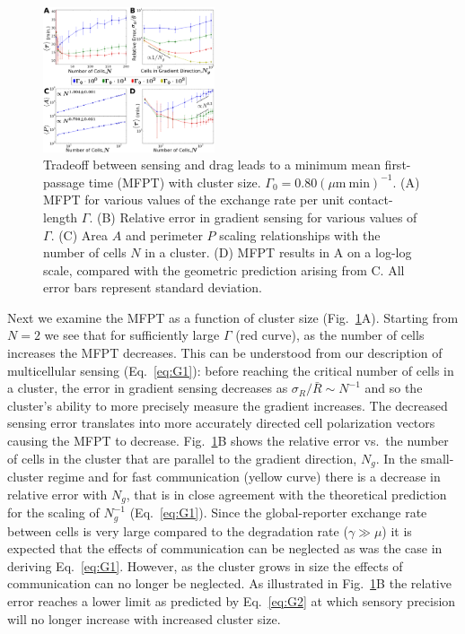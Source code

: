 \begin{figure}[t]
    \centering
        \includegraphics[width=0.45\textwidth]{../fig/ch2_fig3.png}
    \caption{Tradeoff between sensing and drag leads to a minimum mean first-passage time (MFPT) with cluster size. $\Gamma_0 = 0.80 (\mu\text{m} \ \text{min})^{-1}$. (A) MFPT for various values of the exchange rate per unit contact-length $\Gamma$. (B) Relative error in gradient sensing for various values of $\Gamma$. (C) Area $A$ and perimeter $P$ scaling relationships with the number of cells $N$ in a cluster. (D) MFPT results in A on a log-log scale, compared with the geometric prediction arising from C. All error bars represent standard deviation.} \label{fig:results}
\end{figure}


Next we examine the MFPT as a function of cluster size (Fig.\ \ref{fig:results}A). Starting from $N=2$ we see that for sufficiently large $\Gamma$ (red curve), as the number of cells increases the MFPT decreases. This can be understood from our description of multicellular sensing (Eq.\ \ref{eq:G1}): before reaching the critical number of cells in a cluster, the error in gradient sensing decreases as $\sigma_R/\bar{R} \sim N^{-1}$ and so the cluster's ability to more precisely measure the gradient increases. The decreased sensing error translates into more accurately directed cell polarization vectors causing the MFPT to decrease. Fig.\ \ref{fig:results}B shows the relative error vs.\ the number of cells in the cluster that are parallel to the gradient direction, $N_g$. In the small-cluster regime and for fast communication (yellow curve) there is a decrease in relative error with $N_g$, that is in close agreement with the theoretical prediction for the scaling of $N_g^{-1}$
(Eq.\ \ref{eq:G1}). Since the global-reporter exchange rate between cells is very large compared to the degradation rate
($\gamma\gg\mu$)
it is expected that the effects of communication can be neglected as was the case in deriving Eq.\ \ref{eq:G1}. However, as the cluster grows in size the effects of communication can no longer be neglected. As illustrated in Fig.\ \ref{fig:results}B the relative error reaches a lower limit as predicted by Eq.\ \ref{eq:G2} at which sensory precision will no longer increase with increased cluster size.

